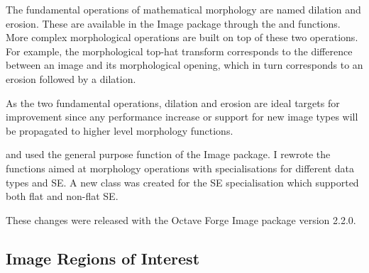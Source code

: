 The fundamental operations of mathematical morphology are named dilation and
erosion.  These are available in the Image package through the
 and  functions.  More complex
morphological operations are built on top of these two operations.  For
example, the morphological top-hat transform corresponds to the difference
between an image and its morphological opening, which in turn
corresponds to an erosion followed by a dilation.

As the two fundamental operations, dilation and erosion are ideal targets for
improvement since any performance increase or
support for new image types will be propagated to
higher level morphology functions.


 and  used the general purpose
 function of the Image package.
I rewrote the functions aimed at morphology operations with
specialisations for different data types and SE.
A new  class was created for the SE specialisation which
supported both flat and non-flat SE.

These changes were released with
the Octave Forge Image package version 2.2.0.


\subsection{Image Regions of Interest}

